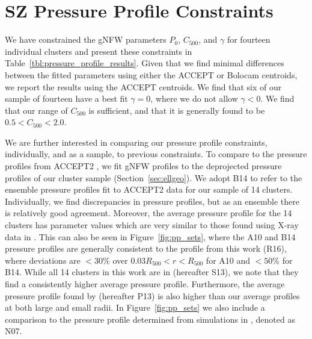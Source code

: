 \documentclass[iop,numberedappendix,apj]{emulateapj}
\begin{document}
\section{SZ Pressure Profile Constraints}
\label{sec:pp_constraints}

We have constrained the gNFW parameters $P_0$, $C_{500}$, and $\gamma$ for fourteen individual clusters and present 
these constraints in Table~\ref{tbl:pressure_profile_results}. Given that we find minimal differences between the 
fitted parameters using either the ACCEPT or Bolocam centroids, we report the results using the ACCEPT centroids.
We find that six of our sample of fourteen have a best fit $\gamma = 0$, where we do not allow $\gamma <0$. 
We find that our range of $C_{500}$ is sufficient, and that it is generally found to be $0.5 < C_{500} < 2.0$. 

We are further interested in comparing our pressure profile constraints, individually, and as a sample, to previous
constraints. To compare to the pressure profiles from ACCEPT2 \citep{baldi2014},
we fit gNFW profiles to the deprojected pressure profiles of our cluster sample (Section~\ref{sec:ellgeo}). 
We adopt B14 to refer to the ensemble pressure profiles fit to ACCEPT2 data for our sample of 14 clusters. 
Individually, we find discrepancies in pressure profiles, but as an ensemble there is relatively good agreement. 
Moreover, the average pressure profile for the 14 clusters has parameter values which are very similar 
to those found using X-ray data in \citet{arnaud2010}. This can also be seen in Figure~\ref{fig:pp_sets}, 
where the A10 and B14 pressure profiles are generally consistent to the profile from this work (R16),
where deviations are $<30$\% over $0.03 R_{500} < r < R_{500}$ for A10 and $<50$\% for B14. 
While all 14 clusters in this work are in \citet{sayers2013} (hereafter S13), we note that they find a consistently higher 
average pressure profile. Furthermore, the average pressure profile found by \citet{planck2013a} (hereafter P13) is also
higher than our average profiles at both large and small radii. In Figure~\ref{fig:pp_sets} we also include
a comparison to the pressure profile determined from simulations in \citet{nagai2007}, denoted as N07.
\end{document}
